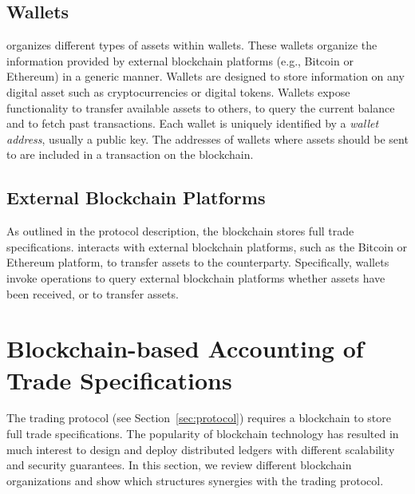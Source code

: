 \subsection{Wallets}
\label{subsec:wallets}
\ModelName{} organizes different types of assets within wallets.
These wallets organize the information provided by external blockchain platforms (e.g., Bitcoin or Ethereum) in a generic manner.
Wallets are designed to store information on any digital asset such as cryptocurrencies or digital tokens.
Wallets expose functionality to transfer available assets to others, to query the current balance and to fetch past transactions.
Each wallet is uniquely identified by a \emph{wallet address}, usually a public key.
The addresses of wallets where assets should be sent to are included in a \TRAgreement{} transaction on the \ModelName{} blockchain.

\subsection{External Blockchain Platforms}
As outlined in the protocol description, the \ModelName{} blockchain stores full trade specifications.
\ModelName{} interacts with external blockchain platforms, such as the Bitcoin or Ethereum platform, to transfer assets to the counterparty.
Specifically, wallets invoke operations to query external blockchain platforms whether assets have been received, or to transfer assets.

\section{Blockchain-based Accounting of Trade Specifications}
\label{sec:blockchain_accounting}
The \ModelName{} trading protocol (see Section~\ref{sec:protocol}) requires a blockchain to store full trade specifications.
The popularity of blockchain technology has resulted in much interest to design and deploy distributed ledgers with different scalability and security guarantees.
In this section, we review different blockchain organizations and show which structures synergies with the \ModelName{} trading protocol.

